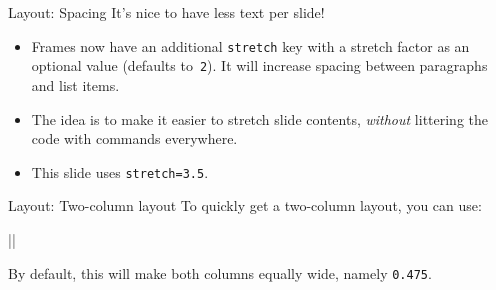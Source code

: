 \documentclass[10pt]{beamer}
\begin{document}
  
  
  



\begin{frame}[fragile,stretch=3.5]{Layout: Spacing}
It's nice to have less text per slide!

\begin{itemize}
    \item Frames now have an additional \alert{\texttt{stretch}} key with a stretch factor as an optional value (defaults to~\texttt{2}).  It will \alert{increase spacing} between paragraphs and list items.

    \item The idea is to make it easier to stretch slide contents, \emph{without} littering the code with \texttt{\vspace{...}} commands everywhere.

    \item This slide uses \texttt{stretch=3.5}.
\end{itemize}

\end{frame}

\begin{frame}[fragile]{Layout: Two-column layout}
To quickly get a two-column layout, you can use:\medskip
    
    ||
    \medskip
    
    By default, this will make both columns equally wide, namely \texttt{0.475\linewidth}.
    
    \bigskip
\end{frame}
\end{document}
